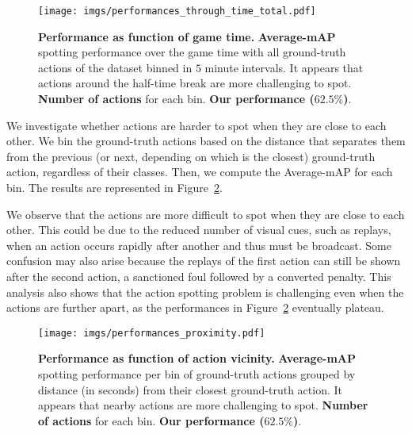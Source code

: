 \documentclass[10pt,twocolumn,letterpaper]{article}
\begin{document}
\begin{figure}
    \centering
    \texttt{[image: imgs/performances\_through\_time\_total.pdf]}
    \caption{\textbf{Performance as function of game time.} 
    {\color{anthoorange}\textbf{Average-mAP}} spotting performance over the game time with all ground-truth actions of the dataset binned in $5$ minute intervals. 
    It appears that actions around the half-time break are more challenging to spot.
    {\color{anthoblue}\textbf{Number of actions}} for each bin.
    {\color{mygray}\textbf{Our performance ($62.5\%$)}}.}
    \label{fig:perfs-through-time}
\end{figure}




We investigate whether actions are harder to spot when they are close to each other. We bin the ground-truth actions based on the distance that separates them from the previous (or next, depending on which is the closest) ground-truth action, regardless of their classes. Then, we compute the Average-mAP for each bin. The results are represented in Figure~\ref{fig:perfs-closeness}. 

We observe that the actions are more difficult to spot when they are close to each other. This could be due to the reduced number of visual cues, such as replays, when an action occurs rapidly after another and thus must be broadcast. Some confusion may also arise because the replays of the first action can still be shown after the second action, \eg a sanctioned foul followed by a converted penalty.
This analysis also shows that the action spotting problem is challenging even when the actions are further apart, as the performances in Figure~\ref{fig:perfs-closeness} eventually plateau.

\begin{figure}
    \centering
    \texttt{[image: imgs/performances\_proximity.pdf]}
    \caption{\textbf{Performance as function of action vicinity.} 
    {\color{anthoorange}\textbf{Average-mAP}} spotting performance per bin of ground-truth actions grouped by distance (in seconds) from their closest  ground-truth action.
    It appears that nearby actions are more challenging to spot.
    {\color{anthoblue}\textbf{Number of actions}} for each bin.
    {\color{mygray}\textbf{Our performance ($62.5\%$)}}.}
    \label{fig:perfs-closeness}
\end{figure}
\end{document}
